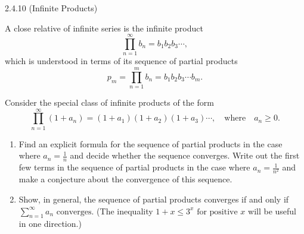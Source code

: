 \begin{exercise}
    {2.4.10 (Infinite Products)}

    A close relative of infinite series is the infinite product
    \[
        \prod_{n=1}^{\infty} b_n = b_1 b_2 b_3 \cdots,
    \]
    which is understood in terms of its sequence of partial products
    \[
        p_m = \prod_{n=1}^{m} b_n = b_1 b_2 b_3 \cdots b_m.
    \]

    Consider the special class of infinite products of the form
    \[
        \prod_{n=1}^{\infty} (1 + a_n) = (1 + a_1)(1 + a_2)(1 + a_3) \cdots, \quad \text{where} \quad a_n \geq 0.
    \]

    \begin{enumerate}
        \item Find an explicit formula for the sequence of partial products in the case where \( a_n = \frac{1}{n} \) and decide whether the sequence converges. Write out the first few terms in the sequence of partial products in the case where \( a_n = \frac{1}{n^2} \) and make a conjecture about the convergence of this sequence.
        \item Show, in general, the sequence of partial products converges if and only if \(\sum_{n=1}^{\infty} a_n \text{ converges.}\)
              (The inequality \(1 + x \leq 3^{x} \text{ for positive } x\) will be useful in one direction.)
    \end{enumerate}
\end{exercise}

